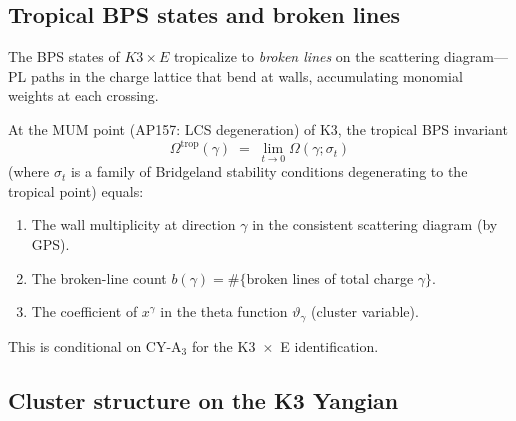 \subsection{Tropical BPS states and broken lines}
\label{subsec:tropical-bps}

The BPS states of $K3 \times E$ tropicalize to \emph{broken lines} on the scattering diagram---PL paths in the charge lattice that bend at walls, accumulating monomial weights at each crossing.

\begin{conjecture}
\label{conj:tropical-bps}
\ClaimStatusConjectured
At the MUM point \textup{(}AP157: LCS degeneration\textup{)} of K3, the tropical BPS invariant
\[
  \Omega^{\mathrm{trop}}(\gamma) \;=\; \lim_{t \to 0} \Omega(\gamma; \sigma_t)
\]
\textup{(}where $\sigma_t$ is a family of Bridgeland stability conditions degenerating to the tropical point\textup{)} equals:
\begin{enumerate}[label=\textup{(\roman*)}]
\item The wall multiplicity at direction $\gamma$ in the consistent scattering diagram \textup{(}by GPS\textup{)}.
\item The broken-line count $b(\gamma) = \#\{$broken lines of total charge $\gamma\}$.
\item The coefficient of $x^\gamma$ in the theta function $\vartheta_\gamma$ \textup{(}cluster variable\textup{)}.
\end{enumerate}
This is conditional on CY-A$_3$ for the K3~$\times$~E identification.
\end{conjecture}

\subsection{Cluster structure on the K3 Yangian}
\label{subsec:tropical-yangian-cluster}

